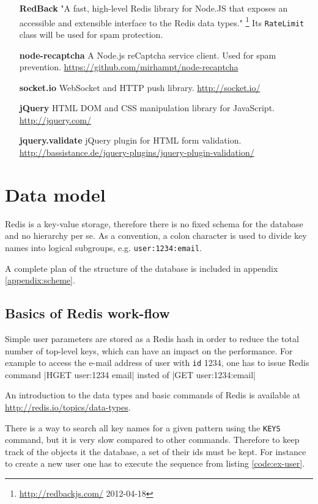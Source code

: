 \documentclass[12pt,oneside]{fithesis}
\begin{document}
\begin{itemize}
			\item[\textbf{RedBack}] "A fast, high-level Redis library for Node.JS that exposes an accessible and extensible interface to the Redis data types." \footnote{\url{http://redbackjs.com/} 2012-04-18} Its \texttt{RateLimit} class will be used for spam protection. 
			\item[\textbf{node-recaptcha}] A Node.js reCaptcha service client. Used for spam prevention. \url{https://github.com/mirhampt/node-recaptcha}
			\item[\textbf{socket.io}] WebSocket and HTTP push library. \url{http://socket.io/}
			\item[\textbf{jQuery}] HTML DOM and CSS manipulation library for JavaScript. \url{http://jquery.com/}
			\item[\textbf{jquery.validate}] jQuery plugin for HTML form validation. \url{http://bassistance.de/jquery-plugins/jquery-plugin-validation/}
		\end{itemize}
\section{Data model}
	Redis is a key-value storage, therefore there is no fixed schema for the database and no hierarchy per se.  As a convention, a colon character is used to divide key names into logical subgroups, e.g. \texttt{user:1234:email}. 
	
	A complete plan of the structure of the database is included in appendix \ref{appendix:scheme}.
	\subsection{Basics of Redis work-flow}
	Simple user parameters are stored as a Redis hash in order to reduce the total number of top-level keys, which can have an impact on the performance. For example to access the e-mail address of user with \texttt{id} 1234, one has to issue Redis command |HGET user:1234 email| insted of |GET user:1234:email|
	
	
	An introduction to the data types and basic commands of Redis is available at \url{http://redis.io/topics/data-types}.
	
	There is a way to search all key names for a given pattern using the \texttt{KEYS} command, but it is very slow compared to other commands. Therefore to keep track of the objects it the database, a set of their ids must be kept. For instance to create a new user one has to execute the sequence from listing \ref{code:ex-user}.
	
\end{document}
